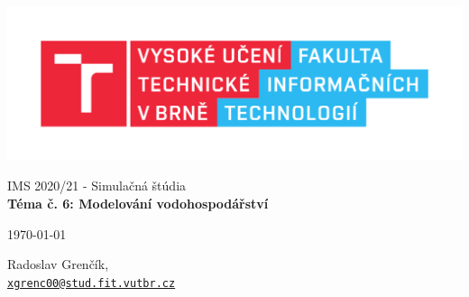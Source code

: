 \documentclass[a4paper, 11pt]{article}
\begin{document}
\begin{titlepage}
	\begin{center}
		\includegraphics[width=0.77 \linewidth]{FIT_logo.pdf}
		
		
		\huge{IMS 2020/21 - Simulačná štúdia} \\
		\LARGE{\textbf{Téma č. 6: Modelování vodohospodářství}}
		
	\end{center}
	\begin{minipage}{0.25 \textwidth}
		\begin{flushleft}
			\Large
			\today
		\end{flushleft}
	\end{minipage}
	\hfill
	\begin{minipage}{0.65 \textwidth}
		\begin{flushright}
			\Large
			Radoslav Grenčík, \\
			\large
			\texttt{\href{mailto:xgrenc00@stud.fit.vutbr.cz}{xgrenc00@stud.fit.vutbr.cz}}
		\end{flushright}
	\end{minipage}
\end{titlepage}

\clearpage
\thispagestyle{empty}
\tableofcontents

\clearpage
{}
\setcounter{page}{3}
\end{document}
